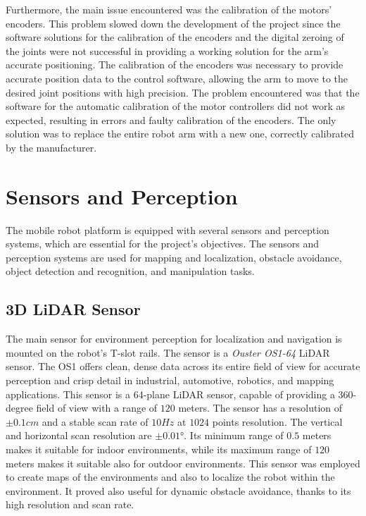 Furthermore, the main issue encountered was the calibration of the motors' encoders. This problem slowed down the development
of the project since the software solutions for the calibration of the encoders and the digital zeroing of the joints were not
successful in providing a working solution for the arm's accurate positioning. The calibration of the encoders was necessary
to provide accurate position data to the control software, allowing the arm to move to the desired joint positions with high
precision. The problem encountered was that the software for the automatic calibration of the motor controllers did not work
as expected, resulting in errors and faulty calibration of the encoders. The only solution was to replace the entire robot
arm with a new one, correctly calibrated by the manufacturer.

\section{Sensors and Perception}

The mobile robot platform is equipped with several sensors and perception systems, which are essential for the project's
objectives. The sensors and perception systems are used for mapping and localization, obstacle avoidance, object detection
and recognition, and manipulation tasks. 

\subsection{3D LiDAR Sensor}

The main sensor for environment perception for localization and navigation is mounted on the robot's T-slot rails.
The sensor is a \textit{Ouster OS1-64} LiDAR sensor.
The OS1 offers clean, dense data across its entire field of view for accurate perception and crisp detail in industrial,
automotive, robotics, and mapping applications.
This sensor is a 64-plane LiDAR sensor, capable of providing a 360-degree field of view with a range of $120$ meters. 
The sensor has a resolution of $\pm 0.1cm$ and a stable scan rate of $10 Hz$ at $1024$ points resolution.
The vertical and horizontal scan resolution are $\pm 0.01$°.
Its minimum range of $0.5$ meters makes it suitable for indoor environments, while its maximum range of $120$ meters
makes it suitable also for outdoor environments.
This sensor was employed to create maps of the environments and also to localize the robot within the environment.
It proved also useful for dynamic obstacle avoidance, thanks to its high resolution and scan rate.

